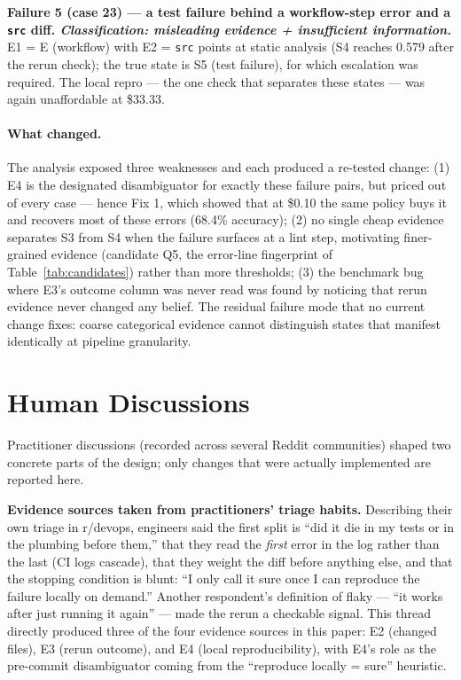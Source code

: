 \documentclass{article}
\begin{document}
\textbf{Failure 5 (case 23) --- a test failure behind a workflow-step error and a \texttt{src} diff. \emph{Classification: misleading evidence + insufficient information.}} E1 = E (workflow) with E2 = \texttt{src} points at static analysis (S4 reaches 0.579 after the rerun check); the true state is S5 (test failure), for which escalation was required. The local repro --- the one check that separates these states --- was again unaffordable at \$33.33.

\paragraph{What changed.} The analysis exposed three weaknesses and each produced a re-tested change: (1) E4 is the designated disambiguator for exactly these failure pairs, but priced out of every case --- hence Fix 1, which showed that at \$0.10 the same policy buys it and recovers most of these errors (68.4\% accuracy); (2) no single cheap evidence separates S3 from S4 when the failure surfaces at a lint step, motivating finer-grained evidence (candidate Q5, the error-line fingerprint of Table~\ref{tab:candidates}) rather than more thresholds; (3) the benchmark bug where E3's outcome column was never read was found by noticing that rerun evidence never changed any belief. The residual failure mode that no current change fixes: coarse categorical evidence cannot distinguish states that manifest identically at pipeline granularity.

\section{Human Discussions}
\label{sec:discussions}

Practitioner discussions (recorded across several Reddit communities) shaped two concrete parts of the design; only changes that were actually implemented are reported here.

\textbf{Evidence sources taken from practitioners' triage habits.} Describing their own triage in r/devops, engineers said the first split is ``did it die in my tests or in the plumbing before them,'' that they read the \emph{first} error in the log rather than the last (CI logs cascade), that they weight the diff before anything else, and that the stopping condition is blunt: ``I only call it sure once I can reproduce the failure locally on demand.'' Another respondent's definition of flaky --- ``it works after just running it again'' --- made the rerun a checkable signal. This thread directly produced three of the four evidence sources in this paper: E2 (changed files), E3 (rerun outcome), and E4 (local reproducibility), with E4's role as the pre-commit disambiguator coming from the ``reproduce locally = sure'' heuristic.
\end{document}
